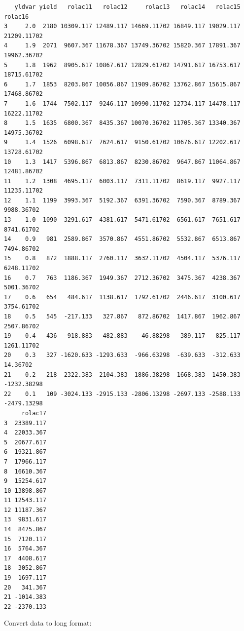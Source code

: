 \documentclass[
  letterpaper,
  DIV=11,
  numbers=noendperiod]{scrartcl}
\begin{document}
\begin{verbatim}
   yldvar yield   rolac11   rolac12     rolac13   rolac14   rolac15     rolac16
3     2.0  2180 10309.117 12489.117 14669.11702 16849.117 19029.117 21209.11702
4     1.9  2071  9607.367 11678.367 13749.36702 15820.367 17891.367 19962.36702
5     1.8  1962  8905.617 10867.617 12829.61702 14791.617 16753.617 18715.61702
6     1.7  1853  8203.867 10056.867 11909.86702 13762.867 15615.867 17468.86702
7     1.6  1744  7502.117  9246.117 10990.11702 12734.117 14478.117 16222.11702
8     1.5  1635  6800.367  8435.367 10070.36702 11705.367 13340.367 14975.36702
9     1.4  1526  6098.617  7624.617  9150.61702 10676.617 12202.617 13728.61702
10    1.3  1417  5396.867  6813.867  8230.86702  9647.867 11064.867 12481.86702
11    1.2  1308  4695.117  6003.117  7311.11702  8619.117  9927.117 11235.11702
12    1.1  1199  3993.367  5192.367  6391.36702  7590.367  8789.367  9988.36702
13    1.0  1090  3291.617  4381.617  5471.61702  6561.617  7651.617  8741.61702
14    0.9   981  2589.867  3570.867  4551.86702  5532.867  6513.867  7494.86702
15    0.8   872  1888.117  2760.117  3632.11702  4504.117  5376.117  6248.11702
16    0.7   763  1186.367  1949.367  2712.36702  3475.367  4238.367  5001.36702
17    0.6   654   484.617  1138.617  1792.61702  2446.617  3100.617  3754.61702
18    0.5   545  -217.133   327.867   872.86702  1417.867  1962.867  2507.86702
19    0.4   436  -918.883  -482.883   -46.88298   389.117   825.117  1261.11702
20    0.3   327 -1620.633 -1293.633  -966.63298  -639.633  -312.633    14.36702
21    0.2   218 -2322.383 -2104.383 -1886.38298 -1668.383 -1450.383 -1232.38298
22    0.1   109 -3024.133 -2915.133 -2806.13298 -2697.133 -2588.133 -2479.13298
     rolac17
3  23389.117
4  22033.367
5  20677.617
6  19321.867
7  17966.117
8  16610.367
9  15254.617
10 13898.867
11 12543.117
12 11187.367
13  9831.617
14  8475.867
15  7120.117
16  5764.367
17  4408.617
18  3052.867
19  1697.117
20   341.367
21 -1014.383
22 -2370.133
\end{verbatim}

Convert data to long format:
\end{document}
